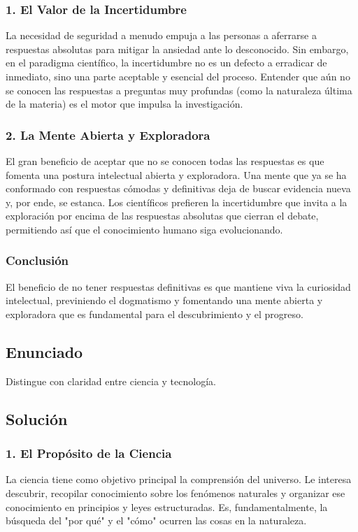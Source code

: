 \documentclass[12pt, a4paper]{article}
\begin{document}
\subsubsection*{1. El Valor de la Incertidumbre}
La necesidad de seguridad a menudo empuja a las personas a aferrarse a respuestas absolutas para mitigar la ansiedad ante lo desconocido. Sin embargo, en el paradigma científico, la incertidumbre no es un defecto a erradicar de inmediato, sino una parte aceptable y esencial del proceso. Entender que aún no se conocen las respuestas a preguntas muy profundas (como la naturaleza última de la materia) es el motor que impulsa la investigación.

\subsubsection*{2. La Mente Abierta y Exploradora}
El gran beneficio de aceptar que no se conocen todas las respuestas es que fomenta una postura intelectual abierta y exploradora. Una mente que ya se ha conformado con respuestas cómodas y definitivas deja de buscar evidencia nueva y, por ende, se estanca. Los científicos prefieren la incertidumbre que invita a la exploración por encima de las respuestas absolutas que cierran el debate, permitiendo así que el conocimiento humano siga evolucionando.

\subsubsection*{Conclusión}
El beneficio de no tener respuestas definitivas es que mantiene viva la curiosidad intelectual, previniendo el dogmatismo y fomentando una mente abierta y exploradora que es fundamental para el descubrimiento y el progreso.

\newpage

\subsection*{Enunciado}
Distingue con claridad entre ciencia y tecnología.

\subsection*{Solución}

\subsubsection*{1. El Propósito de la Ciencia}
La ciencia tiene como objetivo principal la comprensión del universo. Le interesa descubrir, recopilar conocimiento sobre los fenómenos naturales y organizar ese conocimiento en principios y leyes estructuradas. Es, fundamentalmente, la búsqueda del "por qué" y el "cómo" ocurren las cosas en la naturaleza.
\end{document}
